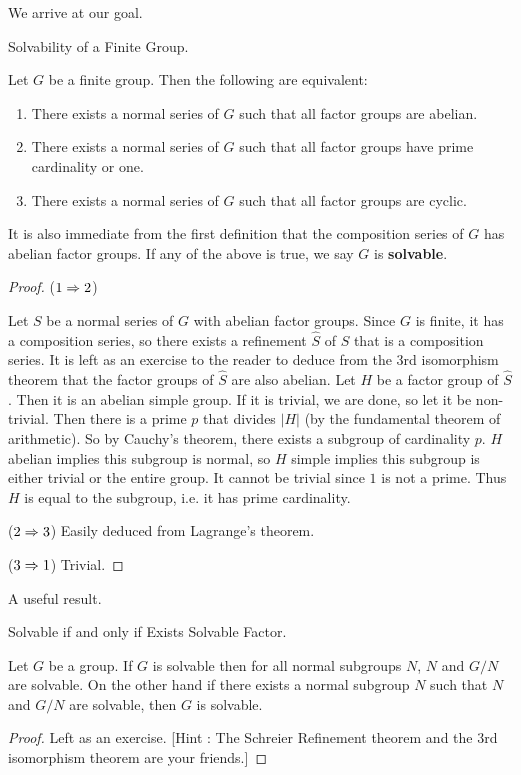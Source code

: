 \documentclass[../../book.tex]{subfiles}
\begin{document}
We arrive at our goal.

\begin{dfn} Solvability of a Finite Group.
    
    Let $G$ be a finite group.
    Then the following are equivalent: \begin{enumerate}
        \item There exists a normal series of $G$ such that 
        all factor groups are abelian.
        \item There exists a normal series of $G$ such that
        all factor groups have prime cardinality or one.
        \item There exists a normal series of $G$ such that
        all factor groups are cyclic.
    \end{enumerate}
    It is also immediate from the first definition that the composition series
    of $G$ has abelian factor groups.
    If any of the above is true, we say $G$ is \textbf{solvable}. 
    
\end{dfn}
\begin{proof}
    
    ($1 \Rightarrow 2$)
        
        Let $S$ be a normal series of $G$ with abelian factor groups.
        Since $G$ is finite, it has a composition series,
        so there exists a refinement $\hat{S}$ of $S$ that is a composition series.
        It is left as an exercise to the reader 
        to deduce from the 3rd isomorphism theorem
        that the factor groups of $\hat{S}$ are also abelian.
        Let $H$ be a factor group of $\hat{S}$. 
        Then it is an abelian simple group. 
        If it is trivial, we are done, so let it be non-trivial.
        Then there is a prime $p$ that divides $|H|$ 
        (by the fundamental theorem of arithmetic).
        So by Cauchy's theorem, there exists a subgroup of cardinality $p$.
        $H$ abelian implies this subgroup is normal, 
        so $H$ simple implies this subgroup is either trivial or the entire group.
        It cannot be trivial since $1$ is not a prime.
        Thus $H$ is equal to the subgroup, i.e. it has prime cardinality. 
        
    ($2 \Rightarrow 3$) Easily deduced from Lagrange's theorem.
    
    ($3 \Rightarrow 1$) Trivial.
\end{proof}
A useful result.
\begin{lem} Solvable if and only if Exists Solvable Factor.
    
    Let $G$ be a group.
    If $G$ is solvable then for all normal subgroups $N$,
    $N$ and $G / N$ are solvable.
    On the other hand if there exists a normal subgroup $N$ such that 
    $N$ and $G / N$ are solvable,
    then $G$ is solvable.
    
\end{lem}
\begin{proof}
    
    Left as an exercise. 
    [Hint : The Schreier Refinement theorem
    and the 3rd isomorphism theorem are your friends.]
    
\end{proof}
\end{document}
